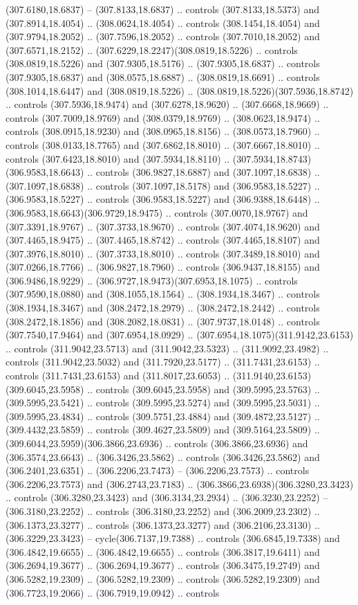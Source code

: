 (307.6180,18.6837) -- (307.8133,18.6837) .. controls (307.8133,18.5373) and (307.8914,18.4054) .. (308.0624,18.4054) .. controls (308.1454,18.4054) and (307.9794,18.2052) .. (307.7596,18.2052) .. controls (307.7010,18.2052) and (307.6571,18.2152) .. (307.6229,18.2247)(308.0819,18.5226) .. controls (308.0819,18.5226) and (307.9305,18.5176) .. (307.9305,18.6837) .. controls (307.9305,18.6837) and (308.0575,18.6887) .. (308.0819,18.6691) .. controls (308.1014,18.6447) and (308.0819,18.5226) .. (308.0819,18.5226)(307.5936,18.8742) .. controls (307.5936,18.9474) and (307.6278,18.9620) .. (307.6668,18.9669) .. controls (307.7009,18.9769) and (308.0379,18.9769) .. (308.0623,18.9474) .. controls (308.0915,18.9230) and (308.0965,18.8156) .. (308.0573,18.7960) .. controls (308.0133,18.7765) and (307.6862,18.8010) .. (307.6667,18.8010) .. controls (307.6423,18.8010) and (307.5934,18.8110) .. (307.5934,18.8743)(306.9583,18.6643) .. controls (306.9827,18.6887) and (307.1097,18.6838) .. (307.1097,18.6838) .. controls (307.1097,18.5178) and (306.9583,18.5227) .. (306.9583,18.5227) .. controls (306.9583,18.5227) and (306.9388,18.6448) .. (306.9583,18.6643)(306.9729,18.9475) .. controls (307.0070,18.9767) and (307.3391,18.9767) .. (307.3733,18.9670) .. controls (307.4074,18.9620) and (307.4465,18.9475) .. (307.4465,18.8742) .. controls (307.4465,18.8107) and (307.3976,18.8010) .. (307.3733,18.8010) .. controls (307.3489,18.8010) and (307.0266,18.7766) .. (306.9827,18.7960) .. controls (306.9437,18.8155) and (306.9486,18.9229) .. (306.9727,18.9473)(307.6953,18.1075) .. controls (307.9590,18.0880) and (308.1055,18.1564) .. (308.1934,18.3467) .. controls (308.1934,18.3467) and (308.2472,18.2979) .. (308.2472,18.2442) .. controls (308.2472,18.1856) and (308.2082,18.0831) .. (307.9737,18.0148) .. controls (307.7540,17.9464) and (307.6954,18.0929) .. (307.6954,18.1075)(311.9142,23.6153) .. controls (311.9042,23.5713) and (311.9042,23.5323) .. (311.9092,23.4982) .. controls (311.9042,23.5032) and (311.7920,23.5177) .. (311.7431,23.6153) .. controls (311.7431,23.6153) and (311.8017,23.6053) .. (311.9140,23.6153)(309.6045,23.5958) .. controls (309.6045,23.5958) and (309.5995,23.5763) .. (309.5995,23.5421) .. controls (309.5995,23.5274) and (309.5995,23.5031) .. (309.5995,23.4834) .. controls (309.5751,23.4884) and (309.4872,23.5127) .. (309.4432,23.5859) .. controls (309.4627,23.5809) and (309.5164,23.5809) .. (309.6044,23.5959)(306.3866,23.6936) .. controls (306.3866,23.6936) and (306.3574,23.6643) .. (306.3426,23.5862) .. controls (306.3426,23.5862) and (306.2401,23.6351) .. (306.2206,23.7473) -- (306.2206,23.7573) .. controls (306.2206,23.7573) and (306.2743,23.7183) .. (306.3866,23.6938)(306.3280,23.3423) .. controls (306.3280,23.3423) and (306.3134,23.2934) .. (306.3230,23.2252) -- (306.3180,23.2252) .. controls (306.3180,23.2252) and (306.2009,23.2302) .. (306.1373,23.3277) .. controls (306.1373,23.3277) and (306.2106,23.3130) .. (306.3229,23.3423) -- cycle(306.7137,19.7388) .. controls (306.6845,19.7338) and (306.4842,19.6655) .. (306.4842,19.6655) .. controls (306.3817,19.6411) and (306.2694,19.3677) .. (306.2694,19.3677) .. controls (306.3475,19.2749) and (306.5282,19.2309) .. (306.5282,19.2309) .. controls (306.5282,19.2309) and (306.7723,19.2066) .. (306.7919,19.0942) .. controls 